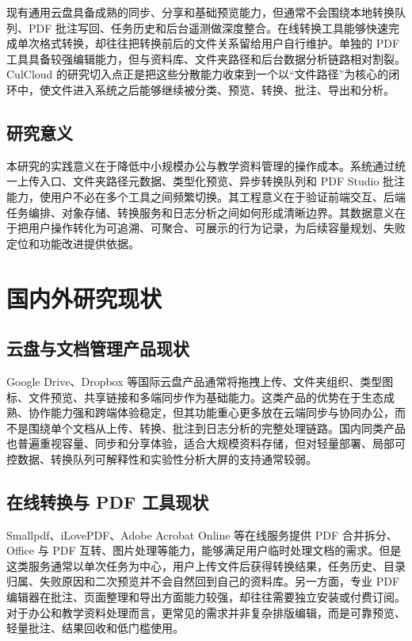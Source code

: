 现有通用云盘具备成熟的同步、分享和基础预览能力，但通常不会围绕本地转换队列、PDF 批注写回、任务历史和后台遥测做深度整合。在线转换工具能够快速完成单次格式转换，却往往把转换前后的文件关系留给用户自行维护。单独的 PDF 工具具备较强编辑能力，但与资料库、文件夹路径和后台数据分析链路相对割裂。CulCloud 的研究切入点正是把这些分散能力收束到一个以“文件路径”为核心的闭环中，使文件进入系统之后能够继续被分类、预览、转换、批注、导出和分析。

\subsection{研究意义}

本研究的实践意义在于降低中小规模办公与教学资料管理的操作成本。系统通过统一上传入口、文件夹路径元数据、类型化预览、异步转换队列和 PDF Studio 批注能力，使用户不必在多个工具之间频繁切换。其工程意义在于验证前端交互、后端任务编排、对象存储、转换服务和日志分析之间如何形成清晰边界。其数据意义在于把用户操作转化为可追溯、可聚合、可展示的行为记录，为后续容量规划、失败定位和功能改进提供依据。

\section{国内外研究现状}

\subsection{云盘与文档管理产品现状}

Google Drive、Dropbox 等国际云盘产品通常将拖拽上传、文件夹组织、类型图标、文件预览、共享链接和多端同步作为基础能力\cite{googledrive,dropboxhelp}。这类产品的优势在于生态成熟、协作能力强和跨端体验稳定，但其功能重心更多放在云端同步与协同办公，而不是围绕单个文档从上传、转换、批注到日志分析的完整处理链路。国内同类产品也普遍重视容量、同步和分享体验，适合大规模资料存储，但对轻量部署、局部可控数据、转换队列可解释性和实验性分析大屏的支持通常较弱。

\subsection{在线转换与 PDF 工具现状}

Smallpdf、iLovePDF、Adobe Acrobat Online 等在线服务提供 PDF 合并拆分、Office 与 PDF 互转、图片处理等能力，能够满足用户临时处理文档的需求。但是这类服务通常以单次任务为中心，用户上传文件后获得转换结果，任务历史、目录归属、失败原因和二次预览并不会自然回到自己的资料库。另一方面，专业 PDF 编辑器在批注、页面整理和导出方面能力较强，却往往需要独立安装或付费订阅。对于办公和教学资料处理而言，更常见的需求并非复杂排版编辑，而是可靠预览、轻量批注、结果回收和低门槛使用。

